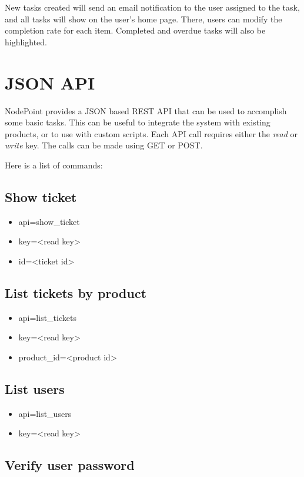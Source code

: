 \documentclass[11pt]{article}
\begin{document}
New tasks created will send an email notification to the user assigned to the task, and all tasks will show on the user's home page. There, users can modify the completion rate for each item. Completed and overdue tasks will also be highlighted.

\clearpage
\section{JSON API}
NodePoint provides a JSON based REST API that can be used to accomplish some basic tasks. This can be useful to integrate the system with existing products, or to use with custom scripts. Each API call requires either the \textit{read} or \textit{write} key. The calls can be made using GET or POST.

Here is a list of commands:

\subsection{Show ticket}

\begin{itemize}
\item api=show\_ticket
\item key=<read key>
\item id=<ticket id>
\end{itemize}

\subsection{List tickets by product}

\begin{itemize}
\item api=list\_tickets
\item key=<read key>
\item product\_id=<product id>
\end{itemize}

\subsection{List users}

\begin{itemize}
\item api=list\_users
\item key=<read key>
\end{itemize}

\subsection{Verify user password}
\end{document}
